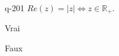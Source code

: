 \begin{truefalse}{q-201}
$Re(z)=|z| \iff z\in \mathbb R_{+}$.
\item* Vrai
\item Faux
\end{truefalse}

